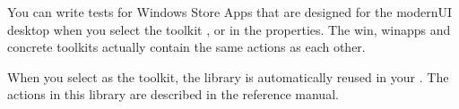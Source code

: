 You can write tests for Windows Store Apps \gdauts{} that are designed for the modernUI desktop when you select the toolkit ,  or  in the \gdproject{} properties. The win, winapps and concrete toolkits actually contain the same actions as each other. 

When you select  as the \gdproject{} toolkit, the library \gdproject{}  is automatically reused in your \gdproject{}. The actions in this library are described in the reference manual.
